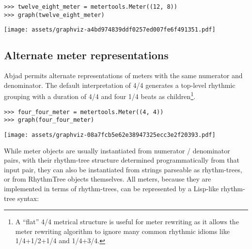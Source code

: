 \begin{singlespacing}
\vspace{-0.5\baselineskip}
\begin{lstlisting}
>>> twelve_eight_meter = metertools.Meter((12, 8))
>>> graph(twelve_eight_meter)
\end{lstlisting}
\noindent\texttt{[image: assets/graphviz-a4bd974839ddf0257ed007fe6f491351.pdf]}
\end{singlespacing}

\subsection{Alternate meter representations} %

Abjad permits alternate representations of meters with the same numerator and
denominator. The default interpretation of 4/4 generates a top-level rhythmic
grouping with a duration of 4/4 and four 1/4 beats as children\footnote{A
\enquote{flat} 4/4 metrical structure is useful for meter rewriting as it
allows the meter rewriting algorithm to ignore many common rhythmic idioms like
1/4+1/2+1/4 and 1/4+3/4.}.

\begin{comment}
<abjad>
four_four_meter = metertools.Meter((4, 4))
graph(four_four_meter)
</abjad>
\end{comment}

\begin{singlespacing}
\vspace{-0.5\baselineskip}
\begin{lstlisting}
>>> four_four_meter = metertools.Meter((4, 4))
>>> graph(four_four_meter)
\end{lstlisting}
\noindent\texttt{[image: assets/graphviz-08a7fcb5e62e38947325ecc3e2f20393.pdf]}
\end{singlespacing}

\noindent While meter objects are usually instantiated from numerator /
denominator pairs, with their rhythm-tree structure determined programmatically
from that input pair, they can also be instantiated from strings parseable as
rhythm-trees, or from RhythmTree objects themselves. All meters, because they
are implemented in terms of rhythm-trees, can be represented by a Lisp-like
rhythm-tree syntax:

\begin{comment}
<abjad>
print(four_four_meter.pretty_rtm_format)
</abjad>
\end{comment}

